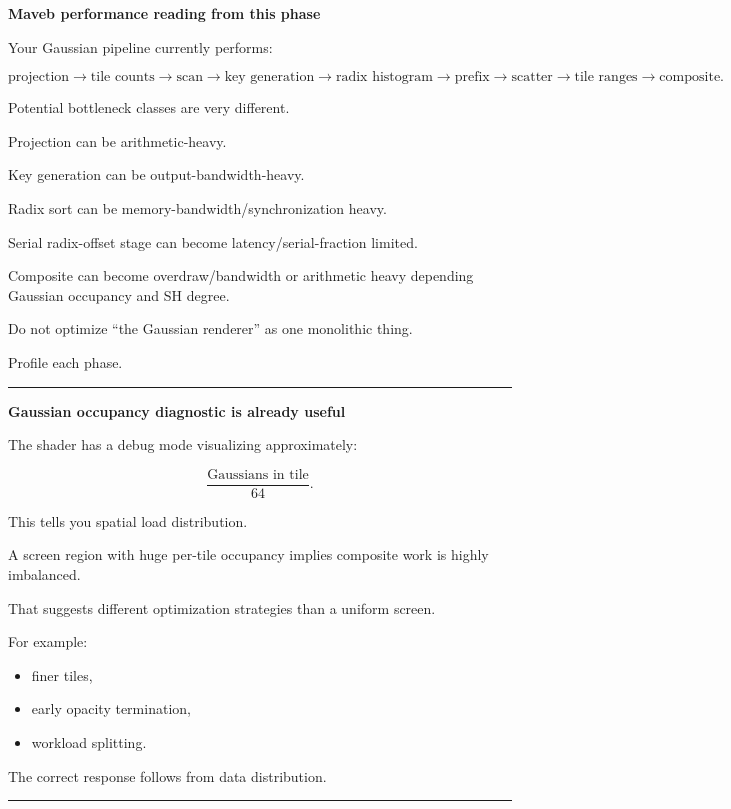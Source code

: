 \textbf{Maveb performance reading from this phase}

Your Gaussian pipeline currently performs:

\[
\text{projection}
\rightarrow
\text{tile counts}
\rightarrow
\text{scan}
\rightarrow
\text{key generation}
\rightarrow
\text{radix histogram}
\rightarrow
\text{prefix}
\rightarrow
\text{scatter}
\rightarrow
\text{tile ranges}
\rightarrow
\text{composite}.
\]

Potential bottleneck classes are very different.

Projection can be arithmetic-heavy.

Key generation can be output-bandwidth-heavy.

Radix sort can be memory-bandwidth/synchronization heavy.

Serial radix-offset stage can become latency/serial-fraction limited.

Composite can become overdraw/bandwidth or arithmetic heavy depending Gaussian occupancy and SH degree.

Do not optimize ``the Gaussian renderer'' as one monolithic thing.

Profile each phase.

\begin{center}\rule{0.5\linewidth}{0.5pt}\end{center}

\textbf{Gaussian occupancy diagnostic is already useful}

The shader has a debug mode visualizing approximately:

\[
\frac{
\text{Gaussians in tile}
}{
64
}.
\]

This tells you spatial load distribution.

A screen region with huge per-tile occupancy implies composite work is highly imbalanced.

That suggests different optimization strategies than a uniform screen.

For example:

\begin{itemize}
\tightlist
\item
  finer tiles,
\item
  early opacity termination,
\item
  workload splitting.
\end{itemize}

The correct response follows from data distribution.

\begin{center}\rule{0.5\linewidth}{0.5pt}\end{center}

